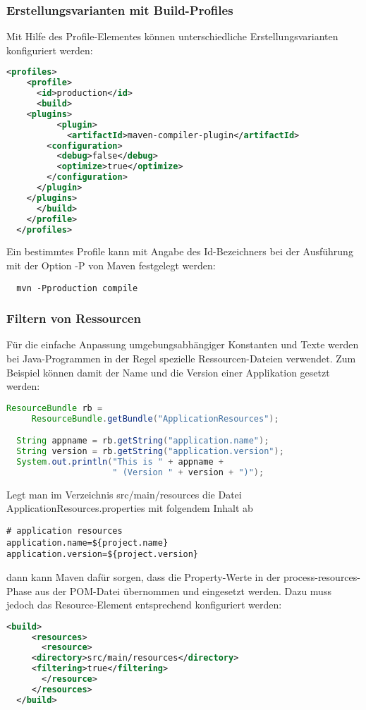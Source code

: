 \subsubsection{Erstellungsvarianten mit Build-Profiles}
Mit Hilfe des Profile-Elementes können unterschiedliche
Erstellungsvarianten konfiguriert werden:
\begin{lstlisting}[language=xml,
  morekeywords={profiles,profile,id,build,plugins,plugin,artifactId,
    configuration,debug,optimize}]
  <profiles>
    <profile>
      <id>production</id>
      <build>
	<plugins>
          <plugin>
            <artifactId>maven-compiler-plugin</artifactId>
	    <configuration>
	      <debug>false</debug>
	      <optimize>true</optimize>
	    </configuration>
	  </plugin>
	</plugins>
      </build>
    </profile>
  </profiles>
\end{lstlisting}
Ein bestimmtes Profile kann mit Angabe des Id-Bezeichners bei der
Ausführung mit der Option -P von Maven festgelegt werden:
\begin{lstlisting}
  mvn -Pproduction compile
\end{lstlisting}
\newslide
\subsubsection{Filtern von Ressourcen}
Für die einfache Anpassung umgebungsabhängiger Konstanten und Texte werden
bei Java-Programmen in der Regel spezielle Ressourcen-Dateien verwendet.
Zum Beispiel können damit der Name und die Version einer Applikation
gesetzt werden:
\begin{lstlisting}[language=java]
  ResourceBundle rb =
     ResourceBundle.getBundle("ApplicationResources");

  String appname = rb.getString("application.name");
  String version = rb.getString("application.version");
  System.out.println("This is " + appname +
                     " (Version " + version + ")");
\end{lstlisting}
\newslide
Legt man im Verzeichnis src/main/resources die Datei
ApplicationResources.properties mit folgendem Inhalt ab
\begin{lstlisting}
# application resources
application.name=${project.name}
application.version=${project.version}
\end{lstlisting}
dann kann Maven dafür sorgen, dass die Property-Werte in der
process-resources-Phase aus der POM-Datei übernommen und eingesetzt
werden.
\newslide
Dazu muss jedoch das
Resource-Element entsprechend konfiguriert werden:
\begin{lstlisting}[language=xml,
morekeywords={build,resources,resource,directory,filtering}]
   <build>
     <resources>
       <resource>
	 <directory>src/main/resources</directory>
	 <filtering>true</filtering>
       </resource>
     </resources>
  </build>
\end{lstlisting}
\newslide
%
